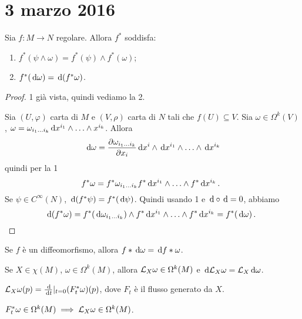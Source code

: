 \chapter{3 marzo 2016}

\begin{theorem}
	Sia $f:M\to N$ regolare. Allora $f^*$ soddisfa:
	\begin{enumerate}
		\item $f^*(\psi \wedge \omega) = f^*(\psi) \wedge f^*(\omega)$;
		\item $f^*(\,\mathrm d \omega) = \,\mathrm d (f^*\omega)$.
	\end{enumerate}
\end{theorem}
\begin{proof}
	1 già vista, quindi vediamo la 2.
	
	Sia $(U,\varphi)$ carta di $M$ e $(V,\rho)$ carta di $N$ tali che $f(U)\subseteq V$. Sia $\omega\in\Omega^k(V)$, $\omega = \omega_{i_1 \dots  i_k} \,\mathrm d x^{i_1}\wedge\ldots\wedge x^{i_k}$. Allora
	\begin{equation*}
		\,\mathrm d \omega = \frac{\partial \omega_{i_1 \dots  i_k}}{\partial x_i} \,\mathrm d x^i \wedge \,\mathrm d x^{i_1} \wedge \ldots \wedge \,\mathrm d x^{i_k}
	\end{equation*}
	quindi per la 1
	\begin{equation*}
		f^*\omega = f^*\omega_{i_1 \dots  i_k} f^*\,\mathrm d x^{i_1} \wedge \ldots \wedge f^* \,\mathrm d x^{i_k}\, \text{. }
	\end{equation*}
	Se $\psi \in C^\infty(N)$, $\,\mathrm d (f^*\psi) = f^* (\,\mathrm d \psi)$. Quindi usando 1 e $\,\mathrm d\circ\,\mathrm d =0$, abbiamo
	\begin{equation*}
		\,\mathrm d (f^*\omega) = f^*(\,\mathrm d \omega_{i_1 \dots  i_k})\wedge f^*\,\mathrm d x^{i_1} \wedge \ldots \wedge f^*\,\mathrm d x^{i_k} = f^*(\,\mathrm d\omega)\, \text{. }
	\end{equation*}
\end{proof}

\begin{corollary}
	Se $f$ è un diffeomorfismo, allora $f*\,\mathrm d\omega = \,\mathrm d f * \omega$.
\end{corollary}

\begin{corollary}
	Se $X\in\chi(M)$, $\omega \in \Omega^k(M)$, allora $\mathcal L_X\omega \in \Omega^k(M)$ e $\,\mathrm d \mathcal L_X\omega = \mathcal L_X \,\mathrm d \omega$.
\end{corollary}

$\mathcal L_X\omega(p) = \frac{\,\mathrm d}{\,\mathrm d t} |_{t=0} (F_t^*\omega)(p)$, dove $F_t$ è il flusso generato da $X$.

$F_t^*\omega\in \Omega^k(M) \implies \mathcal L_X\omega \in \Omega^k(M)$.

